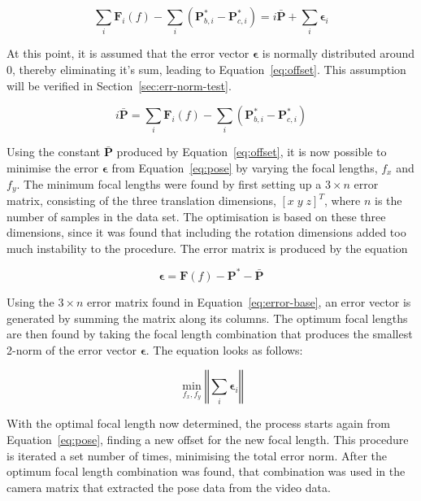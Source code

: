 \[
  \sum\limits_i \bm{F}_i(f) - \sum\limits_i(\bm{P}^*_{b,i} - \bm{P}^*_{c, i}) = i\bar{\bm{P}} + \sum\limits_i\bm{\epsilon}_i
\]

At this point, it is assumed that the error vector $\bm{\epsilon}$ is normally distributed around $0$, thereby eliminating it's sum, leading to Equation~\ref{eq:offset}. This assumption will be verified in Section~\ref{sec:err-norm-test}. 

\begin{equation}
  \label{eq:offset}
  i\bar{\bm{P}} = \sum\limits_i \bm{F}_i(f) - \sum\limits_i(\bm{P}^*_{b,i} - \bm{P}^*_{c, i})
\end{equation}

Using the constant $\bar{\bm{P}}$ produced by Equation~\ref{eq:offset}, it is now possible to minimise the error $\bm{\epsilon}$ from Equation~\ref{eq:pose} by varying the focal lengths, $f_x$ and $f_y$. The minimum focal lengths were found by first setting up a $3\times n$ error matrix, consisting of the three translation dimensions, ${[x\;y\;z]}^T$, where $n$ is the number of samples in the data set. The optimisation is based on these three dimensions, since it was found that including the rotation dimensions added too much instability to the procedure. The error matrix is produced by the equation

\begin{equation}
  \label{eq:error-base}
  \bm{\epsilon} = \bm{F}(f) - \bm{P}^* - \bar{\bm{P}}
\end{equation}

Using the $3\times n$ error matrix found in Equation~\ref{eq:error-base}, an error vector is generated by summing the matrix along its columns. The optimum focal lengths are then found by taking the focal length combination that produces the smallest 2-norm of the error vector $\bm{\epsilon}$. The equation looks as follows:

\begin{equation}
  \label{eq:err-min}
  \min_{f_x, f_y}\left \Vert \sum_i  \bm{\epsilon}_i \right \Vert
\end{equation}

With the optimal focal length now determined, the process starts again from Equation~\ref{eq:pose}, finding a new offset for the new focal length. This procedure is iterated a set number of times, minimising the total error norm. After the optimum focal length combination was found, that combination was used in the camera matrix that extracted the pose data from the video data.

